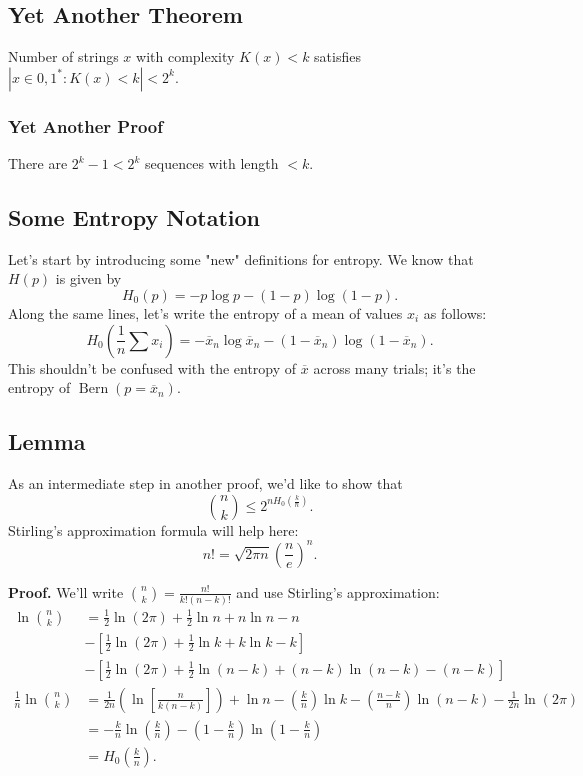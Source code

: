 \documentclass[11pt]{article}
\theoremstyle{definition}
\begin{document}
\subsection{Yet Another Theorem}
\theorem{} Number of strings $x$ with complexity $K(x) < k$ satisfies $|{x \in {0, 1}^*: K(x) < k}| < 2^k$.
\subsubsection{Yet Another Proof}
There are $2^k-1 < 2^k$ sequences with length $< k$.
\subsection{Some Entropy Notation}

Let's start by introducing some "new" definitions for entropy. We know that $H(p)$ is given by $$H_0(p) = -p\log p - (1-p)\log(1-p).$$ Along the same lines, let's write the entropy of a mean of values $x_i$ as follows: $$H_0\left(\frac{1}{n}\sum x_i\right) = -\overline{x}_n \log \overline{x}_n - (1-\overline{x}_n)\log(1-\overline{x}_n).$$ This shouldn't be confused with the entropy of $\overline{x}$ across many trials; it's the entropy of $\operatorname{Bern}(p = \overline{x}_n)$.

\subsection{Lemma}

As an intermediate step in another proof, we'd like to show that $$\binom{n}{k} \le 2^{nH_0(\frac{k}{n})}.$$ Stirling's approximation formula will help here: $$n! = \sqrt{2\pi n} \left(\frac{n}{e}\right)^n.$$

\textbf{Proof.} We'll write $\binom{n}{k} = \frac{n!}{k!(n-k)!}$ and use Stirling's approximation:
\begin{align*}
\ln \binom{n}{k} &= \frac{1}{2} \ln (2\pi) + \frac{1}{2} \ln n + n \ln n - n \\
&-\left[ \frac12 \ln(2\pi) + \frac12 \ln k + k \ln k - k \right] \\
&-\left[\frac12 \ln(2\pi) + \frac12 \ln(n-k) + (n-k)\ln(n-k) - (n-k)\right] \\
\frac 1n \ln \binom nk &= \frac{1}{2n}\left(\ln\left[\frac{n}{k(n-k)}\right]\right) + \ln n - \left(\frac kn\right) \ln k - \left(\frac{n-k}{n}\right) \ln(n-k) - \frac{1}{2n}\ln(2\pi) \\
&= -\frac{k}{n}\ln\left(\frac kn\right) - \left(1 - \frac kn\right) \ln \left(1 - \frac kn\right) \\
&= H_0\left(\frac kn\right).
\end{align*}
\end{document}
